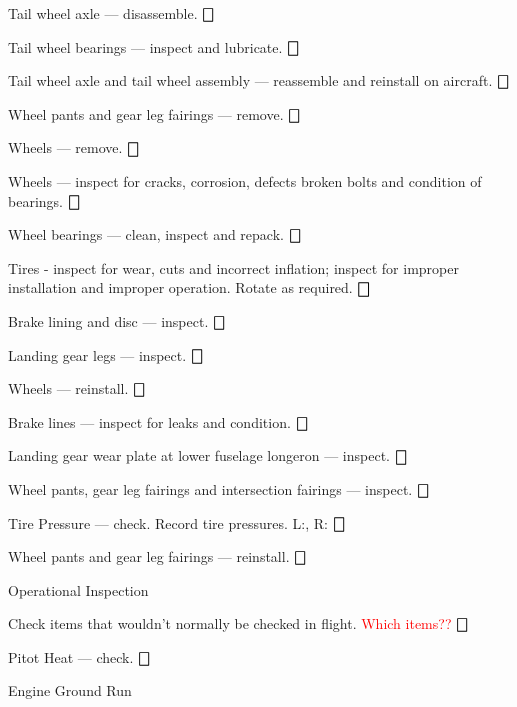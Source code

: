 \begin{enumerate*}
\begin{enumerate*}
\begin{enumerate*}
		  \item Tail wheel axle --- disassemble. \dotfill $\bigbox$
		  \item Tail wheel bearings --- inspect and lubricate. \dotfill $\bigbox$
		  \item Tail wheel axle and tail wheel assembly --- reassemble and reinstall on aircraft. \dotfill $\bigbox$
	  \end{enumerate*}
		\item Wheel pants and gear leg fairings --- remove.  \dotfill $\bigbox$
		\item Wheels --- remove. \dotfill $\bigbox$
		\item Wheels --- inspect for cracks, corrosion, defects broken bolts and condition of bearings. \dotfill $\bigbox$
		\item Wheel bearings --- clean, inspect and repack. \dotfill $\bigbox$
		\item Tires - inspect for wear, cuts and incorrect inflation; inspect for improper installation and improper operation.  Rotate as required. \dotfill $\bigbox$
		\item Brake lining and disc --- inspect. \dotfill $\bigbox$
		\item Landing gear legs --- inspect. \dotfill $\bigbox$
		\item Wheels --- reinstall.  \dotfill $\bigbox$
		\item Brake lines --- inspect for leaks and condition. \dotfill $\bigbox$
		\item Landing gear wear plate at lower fuselage longeron --- inspect. \dotfill $\bigbox$
		\item Wheel pants, gear leg fairings and intersection fairings ---  inspect. \dotfill $\bigbox$
		\item Tire Pressure --- check. Record tire pressures. L:\underline{\makebox[0.5in][l]{}}, R:\underline{\makebox[0.5in][l]{}}  \dotfill $\bigbox$
		\item Wheel pants and gear leg fairings --- reinstall.  \dotfill $\bigbox$
	\end{enumerate*}
	\item{Operational Inspection} 
	\begin{enumerate*}
		\item Check items that wouldn't normally be checked in flight. \textcolor{red}{Which items??}  \dotfill $\bigbox$
		\item Pitot Heat --- check. \dotfill $\bigbox$
	\end{enumerate*}
	\item{Engine Ground Run}

\end{enumerate*}
